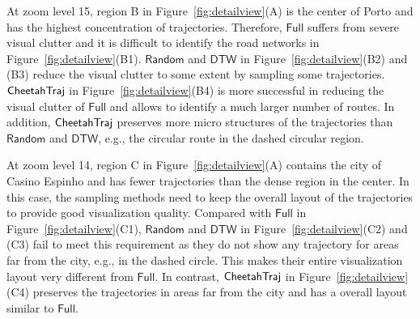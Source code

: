  At zoom level 15, region B in Figure~\ref{fig:detailview}(A) is the center of Porto and has the highest concentration of trajectories. Therefore, $\mathsf{Full}$ suffers from severe visual clutter and it is difficult to identify the road networks in Figure~\ref{fig:detailview}(B1).  $\mathsf{Random}$ and $\mathsf{DTW}$ in Figure~\ref{fig:detailview}(B2) and (B3) reduce the visual clutter to some extent by sampling some trajectories. $\mathsf{CheetahTraj}$ in Figure~\ref{fig:detailview}(B4) is more successful in reducing the visual clutter of $\mathsf{Full}$ and allows to identify a much larger number of routes. In addition, $\mathsf{CheetahTraj}$ preserves more micro structures of the trajectories than $\mathsf{Random}$ and $\mathsf{DTW}$, e.g., the circular route in the dashed circular region.



At zoom level 14, region C in Figure~\ref{fig:detailview}(A) contains the city of Casino Espinho and has fewer trajectories than the dense region in the center. In this case, the sampling methods need to keep the overall layout of the trajectories  to provide good visualization quality. Compared with $\mathsf{Full}$ in Figure~\ref{fig:detailview}(C1), $\mathsf{Random}$ and $\mathsf{DTW}$ in Figure~\ref{fig:detailview}(C2) and (C3) fail to meet this requirement as they do not show any trajectory for areas far from the city, e.g., in the dashed circle. This makes their entire visualization layout very different from $\mathsf{Full}$. In contrast, $\mathsf{CheetahTraj}$ in Figure~\ref{fig:detailview}(C4) preserves the trajectories in areas far from the city and has a overall layout similar to $\mathsf{Full}$.


